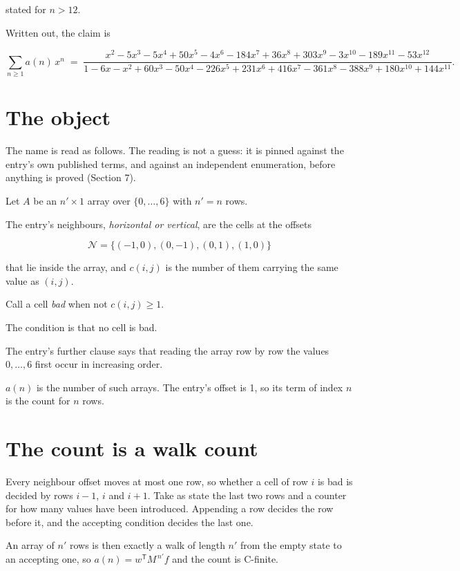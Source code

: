 \documentclass[11pt]{article}
\theoremstyle{definition}
\begin{document}
stated for $n > 12$.

Written out, the claim is

\[\sum_{n \ge 1} a(n)\,x^n \;=\; \frac{x^{2} - 5x^{3} - 5x^{4} + 50x^{5} - 4x^{6} - 184x^{7} + 36x^{8} + 303x^{9} - 3x^{10} - 189x^{11} - 53x^{12}}{1 - 6x - x^{2} + 60x^{3} - 50x^{4} - 226x^{5} + 231x^{6} + 416x^{7} - 361x^{8} - 388x^{9} + 180x^{10} + 144x^{11}}.\]

\section{The object}

The name is read as follows. The reading is not a guess: it is pinned against the entry's own published terms, and against an independent enumeration, before anything is proved (Section 7).

Let $A$ be an $n' \times 1$ array over $\{0,\dots,6\}$ with $n' = n$ rows.

The entry's neighbours, {\itshape horizontal or vertical}, are the cells at the offsets

\[\mathcal{N} = \{(-1,0), (0,-1), (0,1), (1,0)\}\]

that lie inside the array, and $c(i,j)$ is the number of them carrying the same value as $(i,j)$.

Call a cell {\itshape bad} when not $c(i,j) \ge 1$.

The condition is that no cell is bad.

The entry's further clause says that reading the array row by row the values $0,\dots,6$ first occur in increasing order.

$a(n)$ is the number of such arrays. The entry's offset is 1, so its term of index $n$ is the count for $n$ rows.

\section{The count is a walk count}

Every neighbour offset moves at most one row, so whether a cell of row $i$ is bad is decided by rows $i-1$, $i$ and $i+1$. Take as state the last two rows and a counter for how many values have been introduced. Appending a row decides the row before it, and the accepting condition decides the last one.

An array of $n'$ rows is then exactly a walk of length $n'$ from the empty state to an accepting one, so $a(n) = w^{\mathsf T}M^{\,n'}f$ and the count is C-finite.
\end{document}

